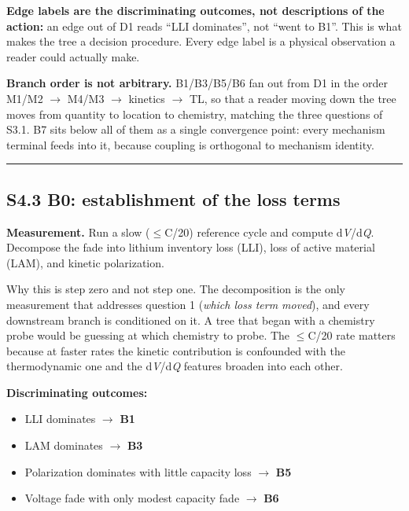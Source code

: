 \documentclass[11pt,a4paper]{article}
\begin{document}
\textbf{Edge labels are the discriminating outcomes, not descriptions of the action:} an edge out of D1 reads \textquotedblleft{}LLI dominates\textquotedblright{}, not \textquotedblleft{}went to B1\textquotedblright{}. This is what makes the tree a decision procedure. Every edge label is a physical observation a reader could actually make.


\textbf{Branch order is not arbitrary.} B1/B3/B5/B6 fan out from D1 in the order M1/M2 \ensuremath{\rightarrow} M4/M3 \ensuremath{\rightarrow} kinetics \ensuremath{\rightarrow} TL, so that a reader moving down the tree moves from quantity to location to chemistry, matching the three questions of S3.1. B7 sits below all of them as a single convergence point: every mechanism terminal feeds into it, because coupling is orthogonal to mechanism identity.


\par\noindent\rule{\linewidth}{0.4pt}\par


\subsection*{S4.3 B0: establishment of the loss terms}


\textbf{Measurement.} Run a slow (\ensuremath{\leq}C/20) reference cycle and compute d\emph{V}/d\emph{Q}. Decompose the fade into lithium inventory loss (LLI), loss of active material (LAM), and kinetic polarization.


Why this is step zero and not step one. The decomposition is the only measurement that addresses question 1 (\emph{which loss term moved}), and every downstream branch is conditioned on it. A tree that began with a chemistry probe would be guessing at which chemistry to probe. The \ensuremath{\leq}C/20 rate matters because at faster rates the kinetic contribution is confounded with the thermodynamic one and the d\emph{V}/d\emph{Q} features broaden into each other.


\textbf{Discriminating outcomes:}


\begin{itemize}
  \item LLI dominates \ensuremath{\rightarrow} \textbf{B1}
  \item LAM dominates \ensuremath{\rightarrow} \textbf{B3}
  \item Polarization dominates with little capacity loss \ensuremath{\rightarrow} \textbf{B5}
  \item Voltage fade with only modest capacity fade \ensuremath{\rightarrow} \textbf{B6}
\end{itemize}
\end{document}
